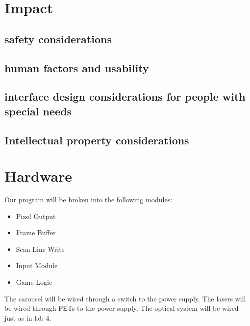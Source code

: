 \documentclass[10pt]{article}
\begin{document}
\begin{comment}
  | A fan                      | $10.93 | \href{http://www.digikey.com/product-detail/en/EFB0612HHA/603-1026-ND/1014357?WT.mc_id=IQ_7595_G_pla1014357}{Potential fan}                                               |   |
  | Mirror                     | $12.02 | \href{http://www.onlinemetals.com/merchant.cfm?pid=7895&step=4&id=735&Cj0KEQjwvve_BRDmg9Kt9ufO15EBEiQAKoc6qk8IH2ER5s-AwA1TZpkKCJNiQJXJGtpEh3BDggOUHxoaApnE8P8HAQ}{Mirror} |   |
  | Speaker Actuator           | $0.00  | Will be salvaged                                                                                                                                                          |   |
  | TOTAL                      | $76.27 |                                                                                                                                                                           |   |
\end{comment}

\section{Impact}
\subsection{safety considerations}
\subsection{human factors and usability}
\subsection{interface design considerations for people with special needs}
\subsection{Intellectual property considerations}

\section{Hardware}

Our program will be broken into the following modules:
\begin{itemize}
\item Pixel Output
\item Frame Buffer
\item Scan Line Write
\item Input Module
\item Game Logic
\end{itemize}

The carousel will be wired through a switch to the power supply.
The lasers will be wired through FETs to the power supply.
The optical system will be wired just as in lab 4.
\end{document}
